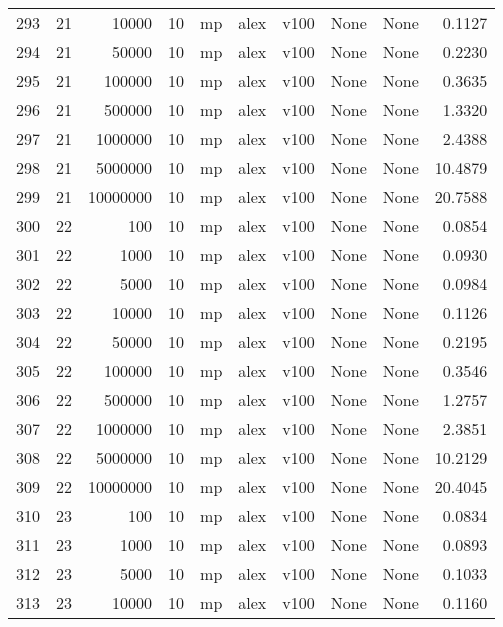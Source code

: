 \begin{tabular}{lrrrlllllr}
293 &  21 &     10000 &      10 &   mp &  alex &  v100 &  None &  None &   0.1127 \\
294 &  21 &     50000 &      10 &   mp &  alex &  v100 &  None &  None &   0.2230 \\
295 &  21 &    100000 &      10 &   mp &  alex &  v100 &  None &  None &   0.3635 \\
296 &  21 &    500000 &      10 &   mp &  alex &  v100 &  None &  None &   1.3320 \\
297 &  21 &   1000000 &      10 &   mp &  alex &  v100 &  None &  None &   2.4388 \\
298 &  21 &   5000000 &      10 &   mp &  alex &  v100 &  None &  None &  10.4879 \\
299 &  21 &  10000000 &      10 &   mp &  alex &  v100 &  None &  None &  20.7588 \\
300 &  22 &       100 &      10 &   mp &  alex &  v100 &  None &  None &   0.0854 \\
301 &  22 &      1000 &      10 &   mp &  alex &  v100 &  None &  None &   0.0930 \\
302 &  22 &      5000 &      10 &   mp &  alex &  v100 &  None &  None &   0.0984 \\
303 &  22 &     10000 &      10 &   mp &  alex &  v100 &  None &  None &   0.1126 \\
304 &  22 &     50000 &      10 &   mp &  alex &  v100 &  None &  None &   0.2195 \\
305 &  22 &    100000 &      10 &   mp &  alex &  v100 &  None &  None &   0.3546 \\
306 &  22 &    500000 &      10 &   mp &  alex &  v100 &  None &  None &   1.2757 \\
307 &  22 &   1000000 &      10 &   mp &  alex &  v100 &  None &  None &   2.3851 \\
308 &  22 &   5000000 &      10 &   mp &  alex &  v100 &  None &  None &  10.2129 \\
309 &  22 &  10000000 &      10 &   mp &  alex &  v100 &  None &  None &  20.4045 \\
310 &  23 &       100 &      10 &   mp &  alex &  v100 &  None &  None &   0.0834 \\
311 &  23 &      1000 &      10 &   mp &  alex &  v100 &  None &  None &   0.0893 \\
312 &  23 &      5000 &      10 &   mp &  alex &  v100 &  None &  None &   0.1033 \\
313 &  23 &     10000 &      10 &   mp &  alex &  v100 &  None &  None &   0.1160 \\

\end{tabular}
